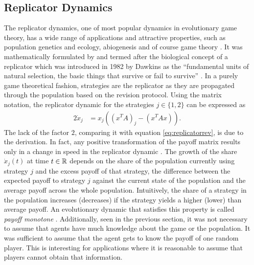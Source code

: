 \subsection{Replicator Dynamics}
\label{sec:replicatordynamic}
The replicator dynamics, one of most popular dynamics in 
evolutionary game theory, has a wide range of applications and 
attractive properties, such as population genetics and ecology, abiogenesis and
of course game theory \parencite[203]{hofbauer_evolutionary_1998}. 
It was mathematically formulated by \textcite{taylor_evolutionary_1978} and 
termed after the biological concept of a replicator which was 
introduced in 1982 by Dawkins as the ``fundamental units of natural selection,
the basic things that survive or fail to survive''
\parencite[254]{dawkins_selfish_2016}. In a purely game theoretical fashion,
strategies are the replicator as they are propagated through the population
based on the revision protocol. Using the matrix notation, 
the replicator dynamic  
for the strategies $j \in \{1,2\}$ can be expressed as
\begin{alignat}{2}
        \dot{x}_j &= x_j\left(\left(x^T A\right)_j -
                \left(x^T A x\right)\right). 
        \label{eq:replicator}
\end{alignat}
The lack of the factor $2$, comparing it with equation 
\eqref{eq:replicatorrev}, is due to the derivation. In fact, any
positive transformation of the payoff matrix 
results only in a change in speed in the replicator dynamic
\parencite[73]{weibull_evolutionary_1997}.
The growth of the share $\dot{x}_j(t)$ at time $t \in \mathbb{R}$ depends 
on the share of the population currently using strategy $j$ and the 
excess payoff of that strategy, the difference between the expected 
payoff to strategy $j$ against the current state of the population and the
average payoff across the whole population.
Intuitively, the share of a strategy in the population increases (decreases) 
if the strategy yields a higher (lower) than average payoff. 
An evolutionary dynamic that satisfies this property is called 
\textit{payoff monotone} \parencite[30]{szabo_evolutionary_2007}. 
Additionally, seen in the previous section, it was not 
necessary to assume that agents have much knowledge about the game or
the population. It was sufficient to assume that the agent gets to know the 
payoff of one random player. This is interesting for applications where it
is reasonable to assume that players cannot obtain that information.

